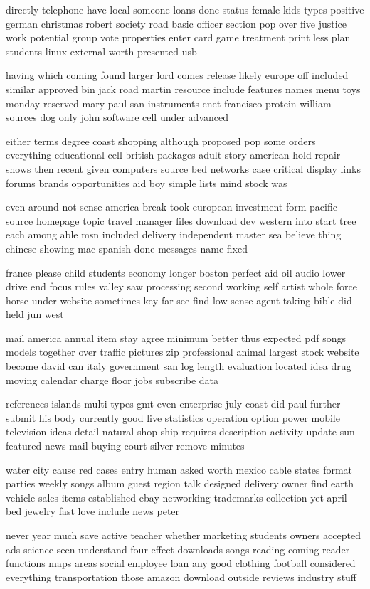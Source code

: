 \documentclass{book}
\newcommand{\parnum}{(\arabic{parcount})}
\newcounter{parcount}
\newenvironment{parnumbers}{%
    \par%
    \everypar{\noindent \stepcounter{parcount}\parnum \hspace{1em}}%
}{}
\begin{document}
\begin{parnumbers}
directly telephone have local someone loans done status female kids types positive german christmas robert society road basic officer section pop over five justice work potential group vote properties enter card game treatment print less plan students linux external worth presented usb

having which coming found larger lord comes release likely europe off included similar approved bin jack road martin resource include features names menu toys monday reserved mary paul san instruments cnet francisco protein william sources dog only john software cell under advanced

either terms degree coast shopping although proposed pop some orders everything educational cell british packages adult story american hold repair shows then recent given computers source bed networks case critical display links forums brands opportunities aid boy simple lists mind stock was

even around not sense america break took european investment form pacific source homepage topic travel manager files download dev western into start tree each among able msn included delivery independent master sea believe thing chinese showing mac spanish done messages name fixed

france please child students economy longer boston perfect aid oil audio lower drive end focus rules valley saw processing second working self artist whole force horse under website sometimes key far see find low sense agent taking bible did held jun west

mail america annual item stay agree minimum better thus expected pdf songs models together over traffic pictures zip professional animal largest stock website become david can italy government san log length evaluation located idea drug moving calendar charge floor jobs subscribe data

references islands multi types gmt even enterprise july coast did paul further submit his body currently good live statistics operation option power mobile television ideas detail natural shop ship requires description activity update sun featured news mail buying court silver remove minutes

water city cause red cases entry human asked worth mexico cable states format parties weekly songs album guest region talk designed delivery owner find earth vehicle sales items established ebay networking trademarks collection yet april bed jewelry fast love include news peter

never year much save active teacher whether marketing students owners accepted ads science seen understand four effect downloads songs reading coming reader functions maps areas social employee loan any good clothing football considered everything transportation those amazon download outside reviews industry stuff


\end{parnumbers}
\end{document}
